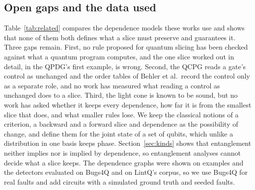 \subsection{Open gaps and the data used}
Table~\ref{tab:related} compares the dependence models these works use and shows that none of them both defines
what a slice must preserve and guarantees it. Three gaps remain. First, no rule proposed
for quantum slicing has been checked against what a quantum program computes, and the one slice worked out in detail,
in the QPDG's first example, is wrong. Second, the QCPG reads a gate's control as unchanged and the order tables of
Behler et al.\ record the control only as a separate role, and no work has measured what reading a control as
unchanged does to a slice. Third, the light cone is known to be sound, but no work
has asked whether it keeps every dependence, how far it is from the smallest slice that does, and what smaller rules
lose. We keep the classical notions of a criterion, a backward and a forward slice and dependence as the possibility
of change, and define them for the joint state of a set of qubits, which unlike a distribution in one basis keeps
phase. Section~\ref{sec:kinds} shows that entanglement neither implies nor is implied by dependence, so entanglement
analyses cannot decide what a slice keeps. The dependence graphs were shown on examples and the detectors evaluated on
Bugs4Q and on LintQ's corpus, so we use Bugs4Q for real faults and add circuits with a simulated ground truth and
seeded faults.

